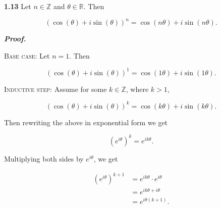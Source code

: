 \documentclass[12pt, a4paper]{article}
\begin{document}
\newpage

\noindent\textbf{1.13} Let $n\in\mathbb{Z}$ and $\theta\in\mathbb{R}$. Then 

\begin{equation*}
    (\cos(\theta)+i\sin(\theta))^n = \cos(n\theta)+i\sin(n\theta).
\end{equation*}

\begin{description}
    \item\textit{\textbf{Proof.}} 
    
    \begin{description}
        \item\textsc{Base case:} Let $n=1$. Then
        
        \begin{equation*}
            (\cos(\theta)+i\sin(\theta))^1=\cos(1\theta)+i\sin(1\theta).
        \end{equation*}
        
        \vspace{2mm}
        
        \item\textsc{Inductive step:} Assume for some $k\in\mathbb{Z}$, where $k>1$,
        
        \begin{equation*}
            (\cos(\theta)+i\sin(\theta))^k = \cos(k\theta)+i\sin(k\theta).
        \end{equation*}
        
        \vspace{2mm}
        
        \item Then rewriting the above in exponential form we get
        
        \begin{equation*}
            (e^{i\theta})^k=e^{ik\theta}.
        \end{equation*}
        
        \vspace{2mm}
        
        \item Multiplying both sides by $e^{i\theta}$, we get
        
        \begin{equation*}
            \begin{split}
                (e^{i\theta})^{k+1} &= e^{ik\theta}\cdot e^{i\theta} \\
                &= e^{ik\theta+i\theta} \\
                &= e^{i\theta(k+1)}. \\
            \end{split}
        \end{equation*}
        

\end{description}
\end{description}
\end{document}
